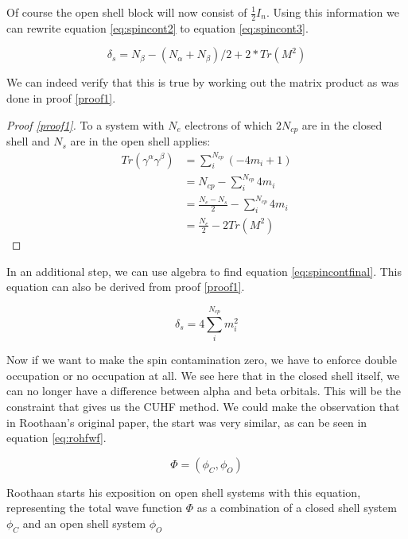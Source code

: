 \documentclass[twoside,twocolumn,9pt]{article}
\begin{document}
Of course the open shell block will now consist of $\frac{1}{2}I_n$. Using this information we can rewrite equation \eqref{eq:spincont2} to equation
\eqref{eq:spincont3}\cite{Scuseria2010}.

\begin{equation}\label{eq:spincont3}
  \delta_s = N_\beta - (N_\alpha + N_\beta)/2 + 2*Tr(M^2)
\end{equation}

We can indeed verify that this is true by working out the matrix product as was done in proof \ref{proof1}.

\begin{proof}[Proof \ref{proof1}]\label{proof1}
  To a system with $N_e$ electrons of which $2N_{cp}$ are in the closed shell and $N_s$ are in the open shell applies:
  \begin{align*}
    Tr(\gamma^\alpha\gamma^\beta) & = \sum^{N_{cp}}_i (-4m_i + 1)               \\
                                  & = N_{cp} - \sum^{N_{cp}}_i 4m_i             \\
                                  & = \frac{N_e - N_s}{2} -\sum^{N_{cp}}_i 4m_i \\
                                  & = \frac{N_e}{2} - 2Tr(M^2)
  \end{align*}
\end{proof}

In an additional step, we can use algebra to find equation \eqref{eq:spincontfinal}. This equation can also be derived from proof \ref{proof1}.

\begin{equation}\label{eq:spincontfinal}
  \delta_s = 4\sum^{N_{cp}}_i m_i^2
\end{equation}

Now if we want to make the spin contamination zero, we have to enforce double occupation or no occupation at all. We see here that in
the closed shell itself, we can no longer have a difference between alpha and beta orbitals. This will be the constraint that gives us the CUHF method. We could make the observation
that in Roothaan's original paper, the start was very similar, as can be seen in equation \eqref{eq:rohfwf}\cite{Roothaan1960}.

\begin{equation}\label{eq:rohfwf}
  \Phi = (\phi_C,\phi_O)
\end{equation}

Roothaan starts his exposition on open shell systems with this equation, representing the total wave function $\Phi$ as a combination of a closed shell system $\phi_C$ and
an open shell system $\phi_O$
\end{document}
